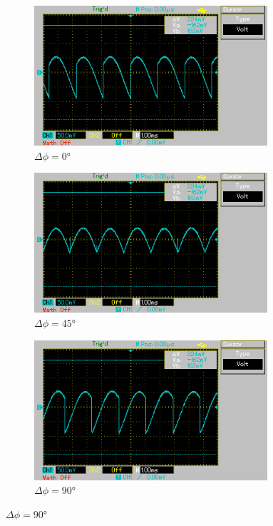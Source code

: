 \begin{figure}
  \centering
  \begin{subfigure}{0.32\textwidth}
    \centering
    \includegraphics[width=0.95\textwidth]{content/0deg.png}
    \caption{$\Delta\phi = 0°$}
    \label{fig:0-deg}
  \end{subfigure}
  \begin{subfigure}{0.32\textwidth}
    \centering
    \includegraphics[width=0.95\textwidth]{content/45deg.png}
    \caption{$\Delta\phi = 45°$}
    \label{fig:45-deg}
  \end{subfigure}
  \begin{subfigure}{0.32\textwidth}
    \centering
    \includegraphics[width=0.95\textwidth]{content/90deg.png}
    \caption{$\Delta\phi = 90°$}
    \label{fig:90-deg}
  \end{subfigure}


\end{figure}
